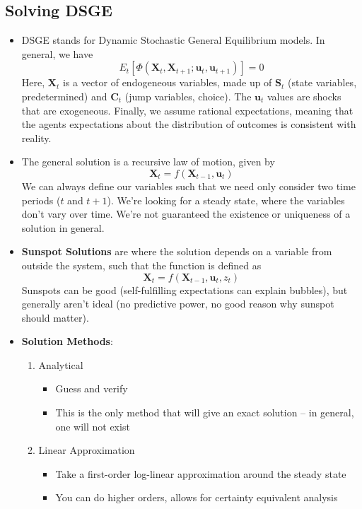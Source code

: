 \documentclass[12pt]{article}
\begin{document}
\subsection{Solving DSGE}

\begin{itemize}
    \item DSGE stands for Dynamic Stochastic General Equilibrium models. In general, we have
    \[E_t[\Phi(\textbf{X}_t, \textbf{X}_{t+1}; \textbf{u}_t, \textbf{u}_{t+1})] = 0\]
    Here, $\textbf{X}_t$ is a vector of endogeneous variables, made up of $\textbf{S}_t$ (state variables, predetermined) and $\textbf{C}_t$ (jump variables, choice). The $\textbf{u}_t$ values are shocks that are exogeneous. Finally, we assume rational expectations, meaning that the agents expectations about the distribution of outcomes is consistent with reality.
    \item The general solution is a recursive law of motion, given by
    \[\textbf{X}_t = f(\textbf{X}_{t-1}, \textbf{u}_t)\]
    We can always define our variables such that we need only consider two time periods ($t$ and $t+1$). We're looking for a steady state, where the variables don't vary over time. We're not guaranteed the existence or uniqueness of a solution in general. 
    \item \textbf{Sunspot Solutions} are where the solution depends on a variable from outside the system, such that the function is defined as
    \[\textbf{X}_t = f(\textbf{X}_{t-1}, \textbf{u}_t, z_t)\]
    Sunspots can be good (self-fulfilling expectations can explain bubbles), but generally aren't ideal (no predictive power, no good reason why sunspot should matter).
    \item \textbf{Solution Methods}:
    \begin{enumerate}
        \item Analytical
        \begin{itemize}
            \item Guess and verify
            \item This is the only method that will give an exact solution -- in general, one will not exist
        \end{itemize}
        \item Linear Approximation
        \begin{itemize}
            \item Take a first-order log-linear approximation around the steady state
            \item You can do higher orders, allows for certainty equivalent analysis

\end{itemize}
\end{enumerate}
\end{itemize}
\end{document}
